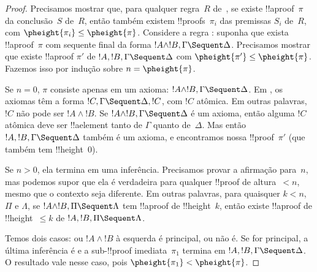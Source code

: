 \documentclass[../../../include/open-logic-section]{subfiles}
\begin{document}
\begin{proof}
Precisamos mostrar que, para qualquer regra~$R$ de~, se existe
!!a{proof}~$\pi$ da conclusão~$S$ de~$R$, então também existem
!!{proof}s~$\pi_i$ das premissas $S_i$ de~$R$, com $\pheight{\pi_i}
\le \pheight{\pi}$. Considere a regra \LeftR{\land}: suponha que exista
!!a{proof}~$\pi$ com sequente final da forma $!A \land !B, \Gamma
\Sequent \Delta$. Precisamos mostrar que existe !!a{proof} $\pi'$ de
$!A, !B, \Gamma \Sequent \Delta$ com $\pheight{\pi'} \le
\pheight{\pi}$. Fazemos isso por indução sobre $n = \pheight{\pi}$.

Se $n = 0$, $\pi$ consiste apenas em um axioma: $!A \land !B, \Gamma
\Sequent \Delta$. Em , os axiomas têm a forma $!C, \Gamma
\Sequent \Delta, !C$, com $!C$ atômica. Em outras palavras, $!C$ não pode ser
$!A \land !B$. Se $!A \land !B, \Gamma \Sequent \Delta$ é um axioma,
então alguma $!C$ atômica deve ser !!a{element} tanto de $\Gamma$
quanto de~$\Delta$. Mas então $!A, !B, \Gamma \Sequent \Delta$ também é um
axioma, e encontramos nossa !!{proof}~$\pi'$ (que também tem
!!{height}~$0$).

Se $n>0$, ela termina em uma inferência. Precisamos provar a afirmação para~$n$,
mas podemos supor que ela é verdadeira para qualquer !!{proof} de altura~$<n$, mesmo
que o contexto seja diferente. Em outras palavras, para quaisquer $k<n$,
$\Pi$ e $\Lambda$, se $!A \land !B, \Pi \Sequent \Lambda$ tem
!!a{proof} de !!{height}~$k$, então existe !!a{proof} de
!!{height}~$\le k$ de $!A, !B, \Pi \Sequent \Lambda$.

Temos dois casos: ou $!A \land
!B$ à esquerda é principal, ou não é. Se for principal, a
última inferência é \LeftR{\land} e a
sub-!!{proof} imediata~$\pi_1$ termina em $!A, !B, \Gamma \Sequent \Delta$. O
resultado vale nesse caso, pois $\pheight{\pi_1} < \pheight{\pi}$.


\end{proof}
\end{document}
